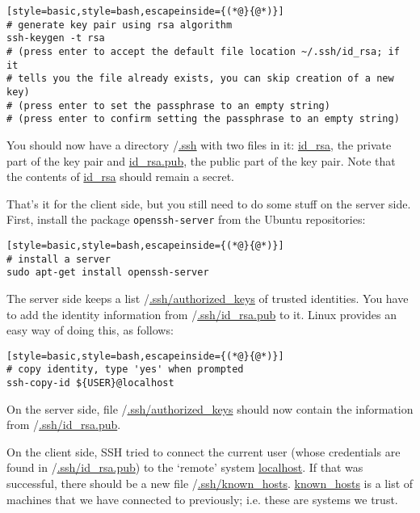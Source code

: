 \begin{lstlisting}[style=basic,style=bash,escapeinside={(*@}{@*)}]
# generate key pair using rsa algorithm
ssh-keygen -t rsa
# (press enter to accept the default file location ~/.ssh/id_rsa; if it
# tells you the file already exists, you can skip creation of a new key)
# (press enter to set the passphrase to an empty string)
# (press enter to confirm setting the passphrase to an empty string)
\end{lstlisting}

You should now have a directory \mytilde/\url{.ssh} with two files in it: \url{id_rsa},  the private part of the key pair and \url{id_rsa.pub}, the public part of the key pair. Note that the contents of \url{id_rsa} should remain a secret.

That's it for the client side, but you still need to do some stuff on the server side. First, install the package \texttt{openssh-server} from the Ubuntu repositories:
\begin{lstlisting}[style=basic,style=bash,escapeinside={(*@}{@*)}]
# install a server
sudo apt-get install openssh-server
\end{lstlisting} %

The server side keeps a list \mytilde/\url{.ssh/authorized_keys} of trusted identities. You have to add the identity information from \mytilde/\url{.ssh/id_rsa.pub} to it. Linux provides an easy way of doing this, as follows:
\begin{lstlisting}[style=basic,style=bash,escapeinside={(*@}{@*)}]
# copy identity, type 'yes' when prompted
ssh-copy-id ${USER}@localhost
\end{lstlisting} %

On the server side, file \mytilde/\url{.ssh/authorized_keys} should now contain the information from \mytilde/\mbox{\url{.ssh/id_rsa.pub}}.

On the client side, SSH tried to connect the current user (whose credentials are found in \mytilde/\url{.ssh/id_rsa.pub}) to the `remote' system \url{localhost}. If that was successful, there should be a new file \mytilde/\url{.ssh/known_hosts}. \url{known_hosts} is a list of machines that we have connected to previously; i.e. these are systems we trust.

